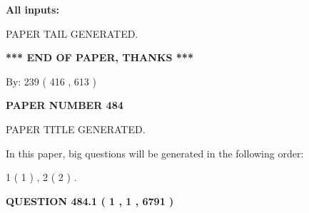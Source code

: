 \documentclass[12pt]{article}
\begin{document}
   
   
   
\noindent{}
   
   
   
   
\noindent\vspace{0.1in}\hspace{-0.08in} {\textbf{\Large{All inputs: }}}
   
   
   
   
   
   
 \vspace{0.2in}
 
   
   
\vspace{2.0in} PAPER TAIL GENERATED.
   
   
   
   
\vspace{1.0in} 
{\textbf{\large{ *** END OF PAPER, THANKS *** }}} 
   
   
\hspace{1.0in} By: 
 239 ( 416 ,  613 )
   
   
   
   
\newpage 
\setcounter{page}{ 
   484001 } 
   
   
   
   
 {\textbf{ \Large{ PAPER NUMBER  484  }}}
   
   
\vspace{0.2in}
   
   
   
   
   
   
   
   
 \vspace{0.2in}
 
 
 
 
   
   
 PAPER TITLE GENERATED.
   
   
   
\vspace{0.2in}
   
In this paper, big questions will be generated in the following order: 
   
   
   1 ( 1 )
 ,
   2 ( 2 )
 .
  
\vspace{0.2in}
  
{\textbf{\Large{QUESTION
484.1 
 ( 1 , 1 , 6791 )
}}}
  
\end{document}
